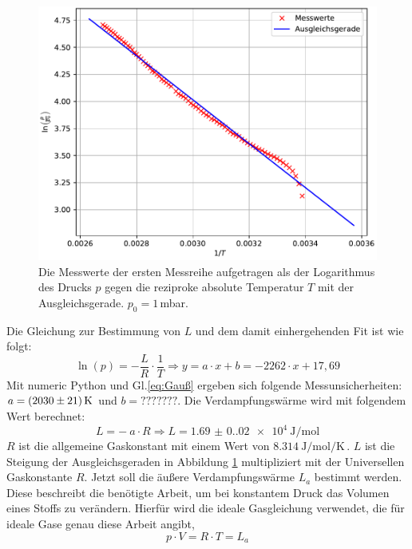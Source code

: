 \begin{figure}[H]
  \centering
  \includegraphics[scale=0.8]{plotc.pdf}
  \caption{Die Messwerte der ersten Messreihe aufgetragen als der Logarithmus des Drucks $p$
  gegen die reziproke absolute Temperatur $T$ mit der Ausgleichsgerade. $p_0=1$\,mbar.}
  \label{fig:Ausgleichsgerade}
\end{figure}\noindent
Die Gleichung zur Bestimmung von $L$ und dem damit einhergehenden Fit ist wie folgt:
\begin{equation}
  \ln(p) = - \frac{L}{R} \cdot \frac{1}{T}
  \Rightarrow y = a \cdot x + b = -2262 \cdot x + 17,69
\end{equation}
Mit numeric Python und Gl.\eqref{eq:Gauß} ergeben sich folgende Messunsicherheiten: $a = \SI{2030 +- 21}{\kelvin}$
und $b = ???????$.
Die Verdampfungswärme wird mit folgendem Wert berechnet:
\begin{equation*}
  L = - \ a \cdot R \Rightarrow L = \SI{1.69(0.02)e4}{\joule\per\mol}
\end{equation*}
$R$ ist die allgemeine Gaskonstant mit einem Wert von $\SI{8.314}{\joule\per\mole\per\kelvin}$\,\cite{Gaskonstante}.
$L$ ist die Steigung der Ausgleichsgeraden in Abbildung \ref{fig:Ausgleichsgerade} multipliziert mit der Universellen Gaskonstante $R$.
\noindent
Jetzt soll die äußere Verdampfungswärme $L_a$ bestimmt werden.
Diese beschreibt die benötigte Arbeit, um bei konstantem Druck das Volumen eines Stoffs zu verändern.
Hierfür wird die ideale Gasgleichung verwendet, die für ideale Gase genau diese Arbeit angibt,
\begin{equation}
    p \cdot V = R \cdot T = L_a
\end{equation}

